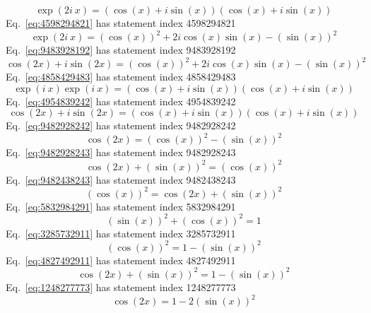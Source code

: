 \documentclass[12pt]{report}
\begin{document}
\begin{equation}
\exp(2i\ x) = (\cos(x)+i \sin(x))(\cos(x)+i \sin(x))
\label{eq:4638429483}
\end{equation}
Eq.~\ref{eq:4598294821} has statement index 4598294821
\begin{equation}
\exp(2i\ x) = (\cos(x))^2+2i\cos(x)\sin(x)-(\sin(x))^2
\label{eq:4598294821}
\end{equation}
Eq.~\ref{eq:9483928192} has statement index 9483928192
\begin{equation}
\cos(2x)+i\sin(2x) = (\cos(x))^2+2i\cos(x)\sin(x)-(\sin(x))^2
\label{eq:9483928192}
\end{equation}
Eq.~\ref{eq:4858429483} has statement index 4858429483
\begin{equation}
\exp(i\ x)\exp(i\ x) = (\cos(x)+i \sin(x))(\cos(x)+i \sin(x))
\label{eq:4858429483}
\end{equation}
Eq.~\ref{eq:4954839242} has statement index 4954839242
\begin{equation}
\cos(2x)+i\sin(2x) = (\cos(x)+i \sin(x))(\cos(x)+i \sin(x))
\label{eq:4954839242}
\end{equation}
Eq.~\ref{eq:9482928242} has statement index 9482928242
\begin{equation}
\cos(2x)=(\cos(x))^2 - (\sin(x))^2
\label{eq:9482928242}
\end{equation}
Eq.~\ref{eq:9482928243} has statement index 9482928243
\begin{equation}
\cos(2x)+(\sin(x))^2=(\cos(x))^2
\label{eq:9482928243}
\end{equation}
Eq.~\ref{eq:9482438243} has statement index 9482438243
\begin{equation}
(\cos(x))^2=\cos(2x)+(\sin(x))^2
\label{eq:9482438243}
\end{equation}
Eq.~\ref{eq:5832984291} has statement index 5832984291
\begin{equation}
(\sin(x))^2 + (\cos(x))^2=1
\label{eq:5832984291}
\end{equation}
Eq.~\ref{eq:3285732911} has statement index 3285732911
\begin{equation}
(\cos(x))^2 = 1-(\sin(x))^2
\label{eq:3285732911}
\end{equation}
Eq.~\ref{eq:4827492911} has statement index 4827492911
\begin{equation}
\cos(2x)+(\sin(x))^2 = 1-(\sin(x))^2
\label{eq:4827492911}
\end{equation}
Eq.~\ref{eq:1248277773} has statement index 1248277773
\begin{equation}
\cos(2x) = 1-2(\sin(x))^2
\label{eq:1248277773}
\end{equation}
\end{document}
